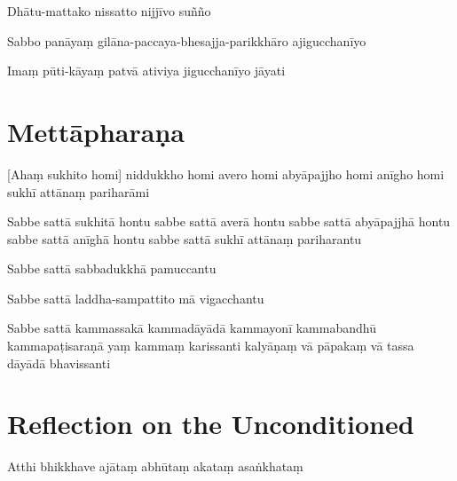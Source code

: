 
Dhātu-mattako nissatto nijjīvo suñño


Sabbo panāyaṃ gilāna-paccaya-bhesajja-parikkhāro ajigucchanīyo


Imaṃ pūti-kāyaṃ patvā ativiya jigucchanīyo jāyati


\section{Mettāpharaṇa}

\begin{leader}
\end{leader}


[Ahaṃ sukhito homi] niddukkho homi avero homi abyāpajjho homi anīgho homi
sukhī attānaṃ pariharāmi

Sabbe sattā sukhitā hontu sabbe sattā averā hontu sabbe sattā abyāpajjhā
hontu sabbe sattā anīghā hontu sabbe sattā sukhī attānaṃ pariharantu

Sabbe sattā sabbadukkhā pamuccantu

Sabbe sattā laddha-sampattito mā vigacchantu

Sabbe sattā kammassakā kammadāyādā kammayonī kammabandhū kammapaṭisaraṇā
yaṃ kammaṃ karissanti kalyāṇaṃ vā pāpakaṃ vā tassa dāyādā bhavissanti


\section[The Unconditioned]{Reflection on the Unconditioned}

\begin{leader}
\end{leader}


Atthi bhikkhave ajātaṃ abhūtaṃ akataṃ asaṅkhataṃ

